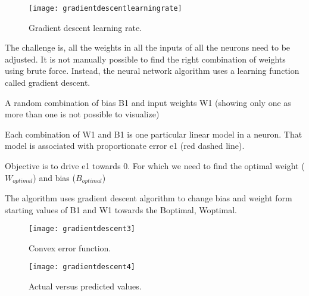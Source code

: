 	\begin{figure}[htb]
		\centering
		\texttt{[image: gradientdescentlearningrate]}
		\caption[Gradient descent learning rate]{Gradient descent learning rate.}
		\label{fig:gradientdescentlearningrate}
	\end{figure}

The challenge is, all the weights in all the inputs of all the neurons need to be adjusted. It is not manually possible to find the right combination of weights using brute force. Instead, the neural network algorithm uses a learning function called gradient descent.
	\begin{numberedlist}
		\item A random combination of bias B1 and input weights W1 (showing only one as more than one is not possible to visualize)
		\item Each combination of W1 and B1 is one particular linear model in a neuron. That model is associated with proportionate error e1 (red dashed line).
		\item Objective is to drive e1 towards 0. For which we need to find the optimal weight ($W_{optimal}$) and bias ($B_{optimal}$)
		\item The algorithm uses gradient descent algorithm to change bias and weight form starting values of B1 and W1 towards the Boptimal, Woptimal.
	\end{numberedlist}

 	\begin{figure}[htb]
		\centering
		\texttt{[image: gradientdescent3]}
		\caption[Convex error function]{Convex error function.}
		\label{fig:gradientdescent3}
	\end{figure}

 	\begin{figure}[htb]
		\centering
		\texttt{[image: gradientdescent4]}
		\caption[Actual versus predicted values]{Actual versus predicted values.}
		\label{fig:gradientdescent4}
	\end{figure}


